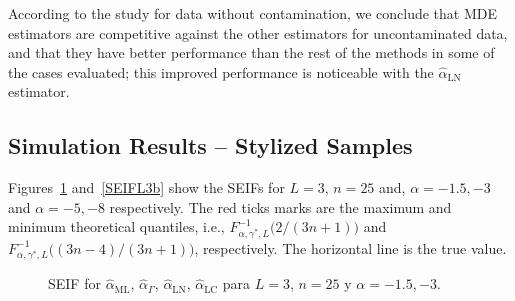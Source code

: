 \documentclass[twocolumn]{svjour3}
\begin{document}

According to the study for data without contamination, we conclude that MDE estimators are competitive against the other estimators for uncontaminated data, and that they have better performance than the rest of the methods in some of the cases evaluated; this improved performance is noticeable with the $\widehat{\alpha}_{\text{{LN}}}$ estimator.

\subsection{Simulation Results -- Stylized Samples}
\label{StylizedSamples}

Figures~\ref{SEIFL3a} and~\ref{SEIFL3b} show the SEIFs for $L=3$, $n=25$ and, $\alpha=-1.5,-3$ and $\alpha=-5,-8$ respectively. 
The red ticks marks are the maximum and minimum theoretical quantiles, i.e., $F^{-1}_{\alpha,\gamma^*,L}\big(2/(3n+1)\big)$ and $F^{-1}_{\alpha,\gamma^*,L}\big((3n-4)/(3n+1)\big)$, respectively.
The horizontal line is the true value.

\begin{figure}[hbt]
\centering
{}%
\caption{SEIF for $\widehat{\alpha}_{\text{{ML}}}$, $\widehat{\alpha}_{\Gamma}$, $\widehat{\alpha}_{\text{{LN}}}$, $\widehat{\alpha}_{\text{{{LC}}}}$ para $L=3$, $n=25$ y $\alpha=-1.5,-3$.}\label{SEIFL3a} 
\end{figure}
\end{document}

